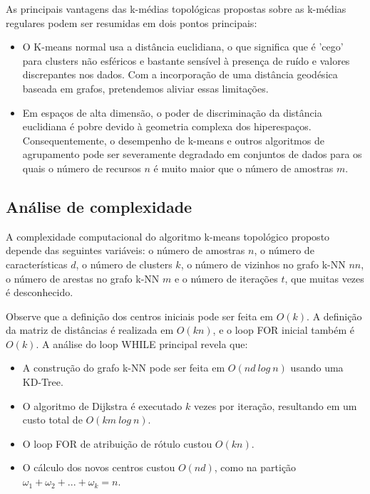 \documentclass[sn-mathphys,Numbered]{sn-jnl}%
\theoremstyle{thmstyleone}%
\theoremstyle{thmstyletwo}%
\theoremstyle{thmstylethree}%
\begin{document}
As principais vantagens das k-médias topológicas propostas sobre as k-médias regulares podem ser resumidas em dois pontos principais:

\begin{itemize}
    \item O K-means normal usa a distância euclidiana, o que significa que é 'cego' para clusters não esféricos e bastante sensível à presença de ruído e valores discrepantes nos dados. Com a incorporação de uma distância geodésica baseada em grafos, pretendemos aliviar essas limitações.
    \item Em espaços de alta dimensão, o poder de discriminação da distância euclidiana é pobre devido à geometria complexa dos hiperespaços. Consequentemente, o desempenho de k-means e outros algoritmos de agrupamento pode ser severamente degradado em conjuntos de dados para os quais o número de recursos $n$ é muito maior que o número de amostras $m$.
\end{itemize}

\subsection{Análise de complexidade}

A complexidade computacional do algoritmo k-means topológico proposto depende das seguintes variáveis: o número de amostras $n$, o número de características $d$, o número de clusters $k$, o número de vizinhos no grafo k-NN $nn$, o número de arestas no grafo k-NN $m$ e o número de iterações $t$, que muitas vezes é desconhecido.

Observe que a definição dos centros iniciais pode ser feita em $O(k)$. A definição da matriz de distâncias é realizada em $O(kn)$, e o loop FOR inicial também é $O(k)$. A análise do loop WHILE principal revela que:

\begin{itemize}
    \item A construção do grafo k-NN pode ser feita em $O(nd~log~n)$ usando uma KD-Tree.
    \item O algoritmo de Dijkstra é executado $k$ vezes por iteração, resultando em um custo total de $O(km~log~n)$.
    \item O loop FOR de atribuição de rótulo custou $O(kn)$.
    \item O cálculo dos novos centros custou $O(nd)$, como na partição $\omega_1 + \omega_2 + ... + \omega_k = n$.
\end{itemize}
\end{document}
